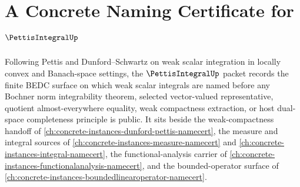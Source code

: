 \chapter{A Concrete Naming Certificate for $\PettisIntegralUp$}
\label{ch:concrete-instances-pettis-integral-namecert}

Following Pettis and Dunford--Schwartz on weak scalar integration in locally convex and Banach-space settings, the $\PettisIntegralUp$ packet records the finite BEDC surface on which weak scalar integrals are named before any Bochner norm integrability theorem, selected vector-valued representative, quotient almost-everywhere equality, weak compactness extraction, or host dual-space completeness principle is public. It sits beside the weak-compactness handoff of \autoref{ch:concrete-instances-dunford-pettis-namecert}, the measure and integral sources of \autoref{ch:concrete-instances-measure-namecert} and \autoref{ch:concrete-instances-integral-namecert}, the functional-analysis carrier of \autoref{ch:concrete-instances-functionalanalysis-namecert}, and the bounded-operator surface of \autoref{ch:concrete-instances-boundedlinearoperator-namecert}.

